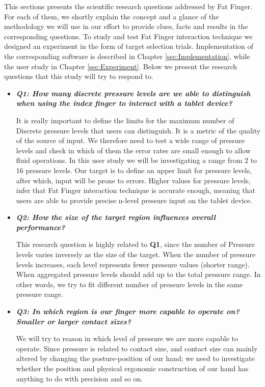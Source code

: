 This sections presents the scientific research questions addressed by Fat Finger. For each of them, we shortly explain the concept and a glance of the methodology we will use in our effort to provide clues, facts and results in the corresponding questions.
To study and test Fat Finger interaction technique we designed an experiment in the form of target selection trials. Implementation of the corresponding software is described in Chapter \ref{sec:Implementation}, while the user study in Chapter \ref{sec:Experiment}. Below we present the research questions that this study will try to respond to.

\begin{itemize}
    \item \emph{\textbf{Q1: How many discrete pressure levels are we able to distinguish when using the index finger to interact with a tablet device?}}

    It is really important to define the limits for the maximum number of Discrete pressure levels that users can distinguish. It is a metric of the quality of the source of input. We therefore need to test a wide range of pressure levels and check in which of them the error rates are small enough to allow fluid operations. In this user study we will be investigating a range from 2 to 16 pressure levels. 
    Our target is to define an upper limit for pressure levels, after which, input will be prone to errors. Higher values for pressure levels, infer that Fat Finger interaction technique is accurate enough, meaning that users are able to provide precise n-level pressure input on the tablet device.

    \item \emph{\textbf{Q2: How the size of the target region influences overall performance?}}

    This research question is highly related to \textbf{Q1}, since the number of Pressure levels varies inversely as the size of the target. When the number of pressure levels increases, each level represents fewer pressure values (shorter range). When aggregated pressure levels should add up to the total pressure range. In other words, we try to fit different number of pressure levels in the same pressure range.

    \item \emph{\textbf{Q3: In which region is our finger more capable to operate on? Smaller or larger contact sizes?}}

    We will try to reason in which level of pressure we are more capable to operate. Since pressure is related to contact size, and contact size can mainly altered by changing the posture-position of our hand; we need to investigate whether the position and physical ergonomic construction of our hand has anything to do with precision and so on.


\end{itemize}
